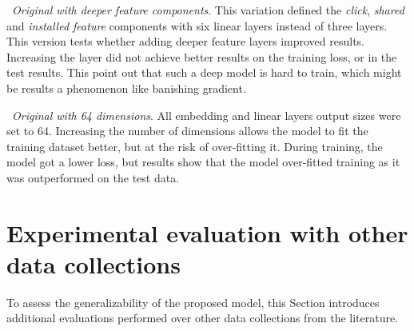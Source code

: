 \documentclass[manuscript,nonacm]{acmart}
\begin{document}
\noindent\textbullet~\textit{Original with deeper feature components}. This variation defined the \textit{click}, \textit{shared} and \textit{installed feature} components with six linear layers instead of three layers. This version tests whether adding deeper feature layers improved results. Increasing the layer did not achieve better results on the training loss, or in the test results. This point out that such a deep model is hard to train, which might be results a phenomenon like banishing gradient.

\noindent\textbullet~\textit{Original with 64 dimensions}. All embedding and linear layers output sizes were set to 64. Increasing the number of dimensions allows the model to fit the training dataset better, but at the risk of over-fitting it. During training, the model got a lower loss, but results show that the model over-fitted training as it was outperformed on the test data.



\begin{table}
    \centering
    \caption{Results obtained for the evaluated models for the ShareChat dataset.}
    \label{tab:results}\vspace{-1.0cm}
\end{table}

\section{Experimental evaluation with other data collections}\label{sec:evaluation-other}

To assess the generalizability of the proposed model, this Section introduces additional evaluations performed over other data collections from the literature.
\end{document}
